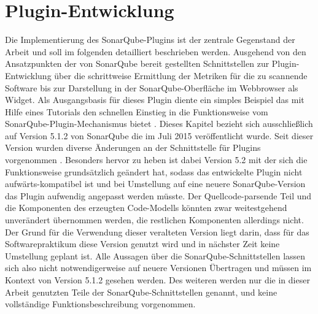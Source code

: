 \documentclass[gb,ngerman]{stthesis}
\begin{document}
	\chapter{Plugin-Entwicklung}
		Die Implementierung des SonarQube-Plugins ist der zentrale Gegenstand der Arbeit und soll im folgenden detailliert beschrieben werden. Ausgehend von den Ansatzpunkten der von SonarQube bereit gestellten Schnittstellen zur Plugin-Entwicklung über die schrittweise Ermittlung der Metriken für die zu scannende Software bis zur Darstellung in der SonarQube-Oberfläche im Webbrowser als Widget. Als Ausgangsbasis für dieses Plugin diente ein simples Beispiel das mit Hilfe eines Tutorials den schnellen Einstieg in die Funktionsweise vom SonarQube-Plugin-Mechanismus bietet \cite{PluginTutorial}. \newline
		Dieses Kapitel bezieht sich ausschließlich auf Version 5.1.2 von SonarQube die im Juli 2015 veröffentlicht wurde. Seit dieser Version wurden diverse Änderungen an der Schnittstelle für Plugins vorgenommen \cite{APIChanges}. Besonders hervor zu heben ist dabei Version 5.2 mit der sich die Funktionsweise grundsätzlich geändert hat, sodass das entwickelte Plugin nicht aufwärts-kompatibel ist und bei Umstellung auf eine neuere SonarQube-Version das Plugin aufwendig angepasst werden müsste. Der Quellcode-parsende Teil und die Komponenten des erzeugten Code-Modells könnten zwar weitestgehend unverändert übernommen werden, die restlichen Komponenten allerdings nicht. Der Grund für die Verwendung dieser veralteten Version liegt darin, dass für das Softwarepraktikum diese Version genutzt wird und in nächster Zeit keine Umstellung geplant ist. Alle Aussagen über die SonarQube-Schnittstellen lassen sich also nicht notwendigerweise auf neuere Versionen Übertragen und müssen im Kontext von Version 5.1.2 gesehen werden. Des weiteren werden nur die in dieser Arbeit genutzten Teile der SonarQube-Schnittstellen genannt, und keine vollständige Funktionsbeschreibung vorgenommen.
\end{document}
